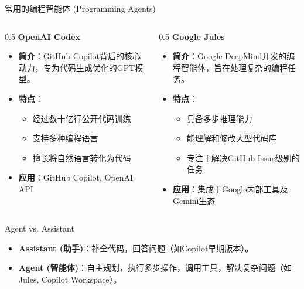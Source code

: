 \documentclass[aspectratio=169,11pt]{beamer}
\begin{document}
\begin{frame}{常用的编程智能体 (Programming Agents)}
    \begin{columns}
        \begin{column}{0.5\textwidth}
            \textbf{OpenAI Codex}
            \begin{itemize}
                \item \textbf{简介}：GitHub Copilot背后的核心动力，专为代码生成优化的GPT模型。
                \item \textbf{特点}：
                    \begin{itemize}
                        \item 经过数十亿行公开代码训练
                        \item 支持多种编程语言
                        \item 擅长将自然语言转化为代码
                    \end{itemize}
                \item \textbf{应用}：GitHub Copilot, OpenAI API
            \end{itemize}
        \end{column}
        \begin{column}{0.5\textwidth}
            \textbf{Google Jules}
            \begin{itemize}
                \item \textbf{简介}：Google DeepMind开发的编程智能体，旨在处理复杂的编程任务。
                \item \textbf{特点}：
                    \begin{itemize}
                        \item 具备多步推理能力
                        \item 能理解和修改大型代码库
                        \item 专注于解决GitHub Issue级别的任务
                    \end{itemize}
                \item \textbf{应用}：集成于Google内部工具及Gemini生态
            \end{itemize}
        \end{column}
    \end{columns}
    \vspace{0.5cm}
    \begin{block}{Agent vs. Assistant}
        \begin{itemize}
            \item \textbf{Assistant (助手)}：补全代码，回答问题（如Copilot早期版本）。
            \item \textbf{Agent (智能体)}：自主规划，执行多步操作，调用工具，解决复杂问题（如Jules, Copilot Workspace）。
        \end{itemize}
    \end{block}
\end{frame}
\end{document}
